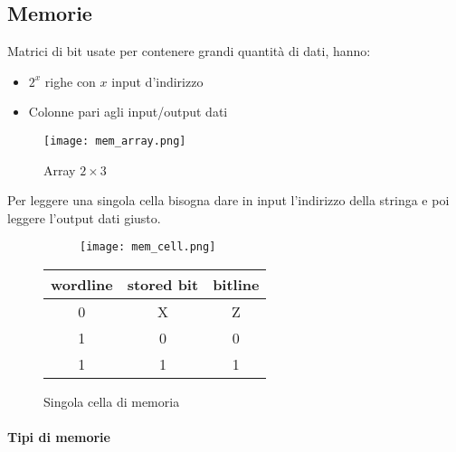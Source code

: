 \documentclass{article}
\begin{document}
\newpage

\subsection{Memorie}

Matrici di bit usate per contenere grandi quantità di dati, hanno:
\begin{itemize}
    \item $2^x$ righe con $x$ input d'indirizzo
    \item Colonne pari agli input/output dati
\end{itemize}

\begin{figure}[ht]
    \centering
    \texttt{[image: mem\_array.png]}
    \caption{Array $2\times 3$}
    \label{fig:mem_array}
\end{figure}

Per leggere una singola cella bisogna dare in input l'indirizzo della stringa e poi leggere l'output dati giusto.

\begin{figure}[ht]
    \begin{minipage}[t]{0.49\textwidth}
    \begin{figure}[H]
        \centering
        \texttt{[image: mem\_cell.png]}
        \label{fig:mem_cell}
    \end{figure}
    \end{minipage}
    \begin{minipage}[t]{0.49\textwidth}
    \centering
        \begin{table}[H]
        \centering
        \begin{tabular}{cc|c}
            wordline & stored bit & bitline\\
            \hline
            0 & X & Z\\
            1 & 0 & 0\\
            1 & 1 & 1\\
        \end{tabular}
    \label{tab:mem_cell}
    \end{table}
\end{minipage}
\caption{Singola cella di memoria}
\end{figure}

\paragraph{Tipi di memorie}
\end{document}
